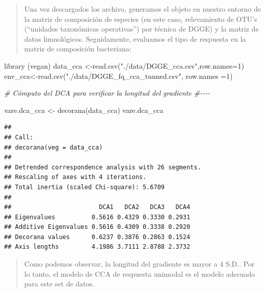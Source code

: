 \documentclass[
]{book}
\newenvironment{Shaded}{\begin{snugshade}}{\end{snugshade}}
\newcommand{\AttributeTok}[1]{\textcolor[rgb]{0.77,0.63,0.00}{#1}}
\newcommand{\CommentTok}[1]{\textcolor[rgb]{0.56,0.35,0.01}{\textit{#1}}}
\newcommand{\DecValTok}[1]{\textcolor[rgb]{0.00,0.00,0.81}{#1}}
\newcommand{\FunctionTok}[1]{\textcolor[rgb]{0.00,0.00,0.00}{#1}}
\newcommand{\NormalTok}[1]{#1}
\newcommand{\OtherTok}[1]{\textcolor[rgb]{0.56,0.35,0.01}{#1}}
\newcommand{\StringTok}[1]{\textcolor[rgb]{0.31,0.60,0.02}{#1}}
\begin{document}
\begin{quote}
Una vez descargados los archivo, generamos el objeto en nuestro entorno de la matriz de composición de especies (en este caso, relevamiento de OTU's (``unidades taxonómicas operativas'') por técnica de DGGE) y la matriz de datos limnológicos. Seguidamente, evaluamos el tipo de respuesta en la matriz de composición bacteriana:
\end{quote}

\begin{Shaded}
\begin{Highlighting}[]
\FunctionTok{library}\NormalTok{ (vegan)}
\NormalTok{data\_cca }\OtherTok{\textless{}{-}}\FunctionTok{read.csv}\NormalTok{(}\StringTok{"./data/DGGE\_cca.csv"}\NormalTok{,}\AttributeTok{row.names=}\DecValTok{1}\NormalTok{)}
\NormalTok{env\_cca}\OtherTok{\textless{}{-}}\FunctionTok{read.csv}\NormalTok{(}\StringTok{"./data/DGGE\_fq\_cca\_tunned.csv"}\NormalTok{, }\AttributeTok{row.names =}\DecValTok{1}\NormalTok{)}
\end{Highlighting}
\end{Shaded}

\begin{Shaded}
\begin{Highlighting}[]
\CommentTok{\# Cómputo del DCA para verificar la longitud del gradiente}
\CommentTok{\#{-}{-}{-}{-}}

\NormalTok{vare.dca\_cca }\OtherTok{\textless{}{-}} \FunctionTok{decorana}\NormalTok{(data\_cca)}
\NormalTok{vare.dca\_cca}
\end{Highlighting}
\end{Shaded}

\begin{verbatim}
## 
## Call:
## decorana(veg = data_cca) 
## 
## Detrended correspondence analysis with 26 segments.
## Rescaling of axes with 4 iterations.
## Total inertia (scaled Chi-square): 5.6709 
## 
##                        DCA1   DCA2   DCA3   DCA4
## Eigenvalues          0.5616 0.4329 0.3330 0.2931
## Additive Eigenvalues 0.5616 0.4309 0.3338 0.2920
## Decorana values      0.6237 0.3876 0.2863 0.1524
## Axis lengths         4.1986 3.7111 2.8788 2.3732
\end{verbatim}

\begin{quote}
Como podemos observar, la longitud del gradiente es mayor a 4 S.D.. Por lo tanto, el modelo de CCA de respuesta unimodal es el modelo adecuado para este set de datos.
\end{quote}
\end{document}
